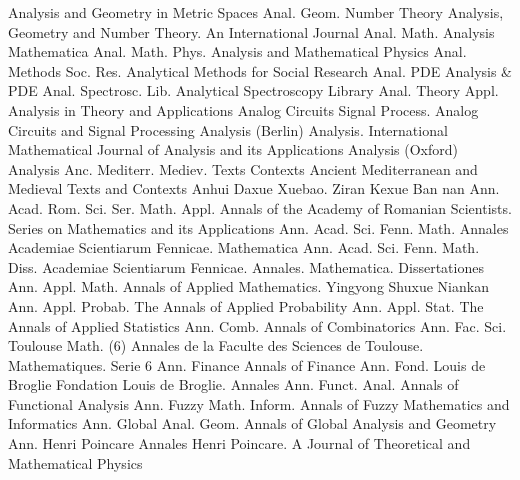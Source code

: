{Analysis and Geometry in Metric Spaces}
{Anal. Geom. Number Theory}
{Analysis, Geometry and Number Theory. An International Journal}
{Anal. Math.}
{Analysis Mathematica}
{Anal. Math. Phys.}
{Analysis and Mathematical Physics}
{Anal. Methods Soc. Res.}
{Analytical Methods for Social Research}
{Anal. PDE}
{Analysis & PDE}
{Anal. Spectrosc. Lib.}
{Analytical Spectroscopy Library}
{Anal. Theory Appl.}
{Analysis in Theory and Applications}
{Analog Circuits Signal Process.}
{Analog Circuits and Signal Processing}
{Analysis (Berlin)}
{Analysis. International Mathematical Journal of Analysis and its Applications}
{Analysis (Oxford)}
{Analysis}
{Anc. Mediterr. Mediev. Texts Contexts}
{Ancient Mediterranean and Medieval Texts and Contexts}
{Anhui Daxue Xuebao. Ziran Kexue Ban}
{nan}
{Ann. Acad. Rom. Sci. Ser. Math. Appl.}
{Annals of the Academy of Romanian Scientists. Series on Mathematics and its Applications}
{Ann. Acad. Sci. Fenn. Math.}
{Annales Academiae Scientiarum Fennicae. Mathematica}
{Ann. Acad. Sci. Fenn. Math. Diss.}
{Academiae Scientiarum Fennicae. Annales. Mathematica. Dissertationes}
{Ann. Appl. Math.}
{Annals of Applied Mathematics. Yingyong Shuxue Niankan}
{Ann. Appl. Probab.}
{The Annals of Applied Probability}
{Ann. Appl. Stat.}
{The Annals of Applied Statistics}
{Ann. Comb.}
{Annals of Combinatorics}
{Ann. Fac. Sci. Toulouse Math. (6)}
{Annales de la Faculte des Sciences de Toulouse. Mathematiques. Serie 6}
{Ann. Finance}
{Annals of Finance}
{Ann. Fond. Louis de Broglie}
{Fondation Louis de Broglie. Annales}
{Ann. Funct. Anal.}
{Annals of Functional Analysis}
{Ann. Fuzzy Math. Inform.}
{Annals of Fuzzy Mathematics and Informatics}
{Ann. Global Anal. Geom.}
{Annals of Global Analysis and Geometry}
{Ann. Henri Poincare}
{Annales Henri Poincare. A Journal of Theoretical and Mathematical Physics}
